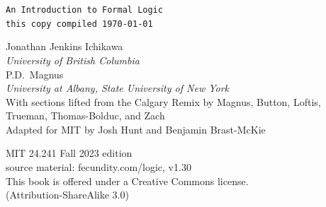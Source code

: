 \thispagestyle{empty}
{\Huge\forallx} %

{\tt An Introduction to Formal Logic\\
this copy compiled \today}
\vfill



{\sf Jonathan Jenkins Ichikawa}\\
\emph{University of British Columbia}
\\
{\sf P.D.\ Magnus}\\
\emph{University at Albany, State University of New York}\\




{\sf With sections lifted from the Calgary Remix by Magnus, Button, Loftis, Trueman, Thomas-Bolduc, and Zach}\\

{\sf Adapted for MIT by Josh Hunt and Benjamin Brast-McKie}\\




\vfill




{\sf
	MIT 24.241 Fall 2023 edition \\%
	source material: fecundity.com/logic, v1.30\\
	This book is offered under a Creative Commons license.\\
	(Attribution-ShareAlike 3.0)
}



\newpage
\thispagestyle{empty}%

